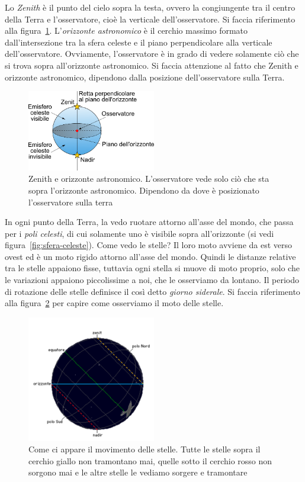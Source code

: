 Lo \emph{Zenith} è il punto del cielo sopra la testa, ovvero la congiungente tra il centro della Terra e l'osservatore, cioè la verticale dell'osservatore. Si faccia riferimento alla figura~\ref{fig:zenith}. L'\emph{orizzonte astronomico} è il cerchio massimo formato dall'intersezione tra la sfera celeste e il piano perpendicolare alla verticale dell'osservatore. Ovviamente, l'osservatore è in grado di vedere solamente ciò che si trova sopra all'orizzonte astronomico. Si faccia attenzione al fatto che Zenith e orizzonte astronomico, dipendono dalla posizione dell'osservatore sulla Terra.

\begin{figure}
\centering
\includegraphics[width=0.5\textwidth]{immagini/zenit.png}
\caption{Zenith e orizzonte astronomico. L'osservatore vede solo ciò che sta sopra l'orizzonte astronomico. Dipendono da dove è posizionato l'osservatore sulla terra}
\label{fig:zenith}
\end{figure}

In ogni punto della Terra, la vedo ruotare attorno all'asse del mondo, che passa per i \emph{poli celesti}, di cui solamente uno è visibile sopra all'orizzonte (si vedi figura~\ref{fig:sfera-celeste}). Come vedo le stelle? Il loro moto avviene da est verso ovest ed è un moto rigido attorno all'asse del mondo. Quindi le distanze relative tra le stelle appaiono fisse, tuttavia ogni stella si muove di moto proprio, solo che le variazioni appaiono piccolissime a noi, che le osserviamo da lontano. Il periodo di rotazione delle stelle definisce il così detto \emph{giorno siderale}. Si faccia riferimento alla figura~\ref{fig:movimento-stelle} per capire come osserviamo il moto delle stelle.

\begin{figure}
\centering
\includegraphics[width=0.5\textwidth]{immagini/movimento-stelle.png}
\caption{Come ci appare il movimento delle stelle. Tutte le stelle sopra il cerchio giallo non tramontano mai, quelle sotto il cerchio rosso non sorgono mai e le altre stelle le vediamo sorgere e tramontare}
\label{fig:movimento-stelle}
\end{figure}


